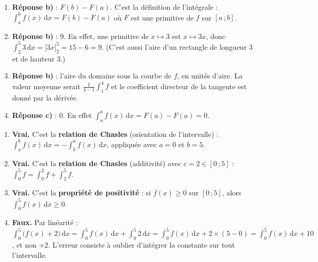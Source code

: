 \documentclass[11pt]{article}
\begin{document}
\begin{corrige}
\begin{enumerate}
\item \textbf{Réponse b)} : $F(b)-F(a)$. C'est la définition de l'intégrale : $\displaystyle\int_a^b f(x)\,\mathrm{d}x = F(b)-F(a)$ où $F$ est une primitive de $f$ sur $[a\,;b]$.
\item \textbf{Réponse b)} : $9$. En effet, une primitive de $x\mapsto 3$ est $x\mapsto 3x$, donc $\displaystyle\int_2^5 3\,\mathrm{d}x = \big[3x\big]_2^5 = 15-6 = 9$. (C'est aussi l'aire d'un rectangle de longueur $3$ et de hauteur $3$.)
\item \textbf{Réponse b)} : l'aire du domaine sous la courbe de $f$, en unités d'aire. La valeur moyenne serait $\frac{1}{4-1}\int_1^4 f$ et le coefficient directeur de la tangente est donné par la dérivée.
\item \textbf{Réponse c)} : $0$. En effet $\displaystyle\int_a^a f(x)\,\mathrm{d}x = F(a)-F(a) = 0$.
\end{enumerate}
\end{corrige}

\begin{corrige}
\begin{enumerate}
\item \textbf{Vrai.} C'est la \textbf{relation de Chasles} (orientation de l'intervalle) : $\displaystyle\int_a^b f(x)\,\mathrm{d}x = -\int_b^a f(x)\,\mathrm{d}x$, appliquée avec $a=0$ et $b=5$.
\item \textbf{Vrai.} C'est la \textbf{relation de Chasles} (additivité) avec $c=2\in[0\,;5]$ : $\displaystyle\int_0^5 f = \int_0^2 f + \int_2^5 f$.
\item \textbf{Vrai.} C'est la \textbf{propriété de positivité} : si $f(x)\geq 0$ sur $[0\,;5]$, alors $\displaystyle\int_0^5 f(x)\,\mathrm{d}x \geq 0$.
\item \textbf{Faux.} Par linéarité : $\displaystyle\int_0^5 \big(f(x)+2\big)\,\mathrm{d}x = \int_0^5 f(x)\,\mathrm{d}x + \int_0^5 2\,\mathrm{d}x = \int_0^5 f(x)\,\mathrm{d}x + 2\times(5-0) = \int_0^5 f(x)\,\mathrm{d}x + 10$, et non $+2$. L'erreur consiste à oublier d'intégrer la constante sur tout l'intervalle.
\end{enumerate}
\end{corrige}
\end{document}
